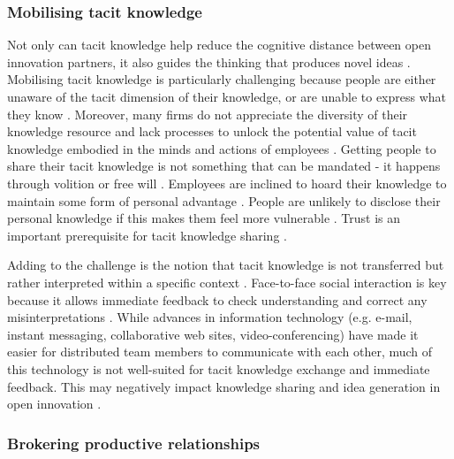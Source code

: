 \subsubsection{Mobilising tacit knowledge}

Not only can tacit knowledge help reduce the cognitive distance between open innovation partners, it also guides the thinking that produces novel ideas \citep{leonard1998role,amar2008descriptive}. Mobilising tacit knowledge is particularly challenging because people are either unaware of the tacit dimension of their knowledge, or are unable to express what they know \citep{polanyi1966tacit,leonard1998role}. Moreover, many firms do not appreciate the diversity of their knowledge resource and lack processes to unlock the potential value of tacit knowledge embodied in the minds and actions of employees \citep{nonaka1994dynamic,horvath2000working}. Getting people to share their tacit knowledge is not something that can be mandated - it happens through volition or free will \citep{polanyi1966tacit}. Employees are inclined to hoard their knowledge to maintain some form of personal advantage \citep{eraut2000non,riege2005three,milne2007motivation}. People are unlikely to disclose their personal knowledge if this makes them feel more vulnerable \citep{levin2004strength}. Trust is an important prerequisite for tacit knowledge sharing \citep{kucharska2016trust}. \medskip

Adding to the challenge is the notion that tacit knowledge is not transferred but rather interpreted within a specific context \citep{nonaka1995knowledge,duguid2005art,marabelli2014knowing}. Face-to-face social interaction is key because it allows immediate feedback to check understanding and correct any misinterpretations \citep{koskinen2003tacit}. While advances in information technology (e.g. e-mail, instant messaging, collaborative web sites, video-conferencing) have made it easier for distributed team members to communicate with each other, much of this technology is not well-suited for tacit knowledge exchange and immediate feedback. This may negatively impact knowledge sharing and idea generation in open innovation \citep{johannessen2001mismanagement}. \medskip


\subsubsection{Brokering productive relationships} %

